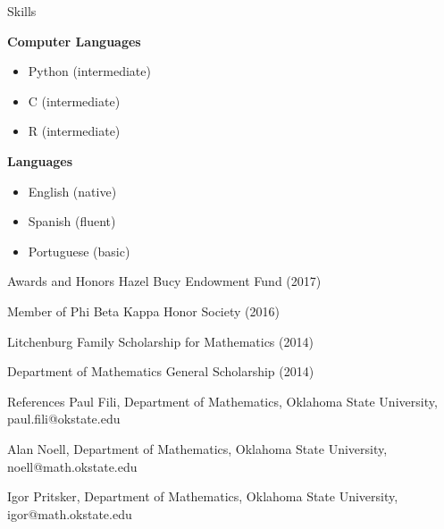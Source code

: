 \documentclass{resume} %
\begin{document}
\begin{rSection}{Skills}

{\bf Computer Languages}
\begin{itemize}
\item Python (intermediate)
\item C (intermediate)
\item R (intermediate)
\end{itemize}

{\bf Languages}
\begin{itemize}
\item English (native)
\item Spanish (fluent)
\item Portuguese (basic)
\end{itemize}

\end{rSection}

\begin{rSection}{Awards and Honors}
Hazel Bucy Endowment Fund (2017)

Member of Phi Beta Kappa Honor Society (2016)

Litchenburg Family Scholarship for Mathematics (2014)

Department of Mathematics General  Scholarship (2014)
\end{rSection}
\newpage
\begin{rSection}{References}
Paul Fili, Department of Mathematics, Oklahoma State University, paul.fili@okstate.edu

Alan Noell, Department of Mathematics, Oklahoma State University, noell@math.okstate.edu

Igor Pritsker, Department of Mathematics, Oklahoma State University, igor@math.okstate.edu
\end{rSection}
\end{document}
